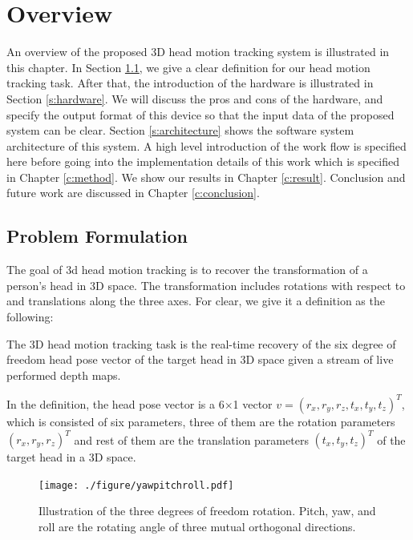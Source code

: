 \newenvironment{definition}[1][Definition]{\begin{trivlist}
\item[\hskip \labelsep {\bfseries #1}]}{\end{trivlist}}

\chapter{Overview}
\label{c:overview}
An overview of the proposed 3D head motion tracking system is illustrated in this chapter. In Section \ref{s:problem}, we give a clear definition for our head motion tracking task. After that, the introduction of the hardware is illustrated in Section \ref{s:hardware}. We will discuss the pros and cons of the hardware, and specify the output format of this device so that the input data of the proposed system can be clear. Section \ref{s:architecture} shows the software system architecture of this system. A high level introduction of the work flow is specified here before going into the implementation details of this work which is specified in Chapter \ref{c:method}. We show our results in Chapter \ref{c:result}. Conclusion and future work are discussed in Chapter \ref{c:conclusion}.

\section{Problem Formulation}
\label{s:problem}
The goal of 3d head motion tracking is to recover the transformation of a person's head in 3D space. The transformation includes rotations with respect to and translations along the three axes. For clear, we give it a definition as the following:
\begin{definition}
The 3D head motion tracking task is the real-time recovery of the six degree of freedom head pose vector of the target head in 3D space given a stream of live performed depth maps.
\end{definition}
In the definition, the head pose vector is a 6$\times$1 vector $v = (r_{x},r_{y},r_{z},t_{x},t_{y},t_{z})^{T}$, which is consisted of six parameters, three of them are the rotation parameters $(r_{x},r_{y},r_{z})^{T}$ and rest of them are the translation parameters $(t_{x},t_{y},t_{z})^{T}$ of the target head in a 3D space.
\begin{figure}
\centering
\texttt{[image: ./figure/yawpitchroll.pdf]}
\caption{Illustration of the three degrees of freedom rotation. Pitch, yaw, and roll are the rotating angle of three mutual orthogonal directions.}
\label{f:rollpitchyaw}
\end{figure}

